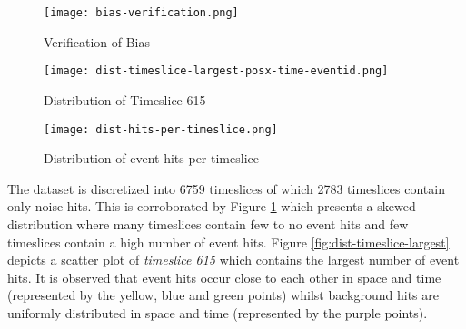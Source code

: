  \begin{figure}[htb]
   \begin{minipage}{0.32\textwidth}
     \centering
     \texttt{[image: bias-verification.png]}
     \caption{Verification of Bias}%
     \label{fig:bias-verification}     
   \end{minipage}
   \begin{minipage}{0.32\textwidth}
     \centering
     \texttt{[image: dist-timeslice-largest-posx-time-eventid.png]}
     \caption{Distribution of Timeslice 615}%
     \label{fig:dist-timeslice-largest}    
   \end{minipage}
   \begin{minipage}{0.32\textwidth}
     \centering
     \texttt{[image: dist-hits-per-timeslice.png]}
     \caption{Distribution of event hits per timeslice}%
     \label{fig:dist-hits-per-timeslice}    
   \end{minipage}
 \end{figure}

 The dataset is discretized into 6759 timeslices of which 2783
 timeslices contain only noise hits. This is corroborated by Figure
 \ref{fig:dist-hits-per-timeslice} which presents a skewed
 distribution where many timeslices contain few to no event hits and
 few timeslices contain a high number of event hits. Figure
 \ref{fig:dist-timeslice-largest} depicts a scatter plot of
 \emph{timeslice 615} which contains the largest number of event hits.
 It is observed that event hits occur close to each other in space and
 time (represented by the yellow, blue and green points) whilst
 background hits are uniformly distributed in space and time
 (represented by the purple points).

